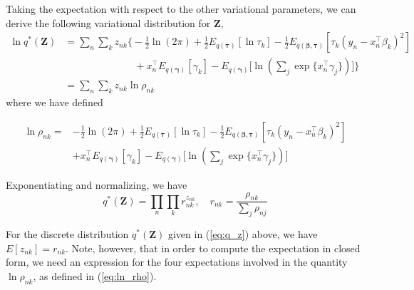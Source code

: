 \documentclass[twoside,11pt]{article}
\newcommand{\tr}{\intercal}
\begin{document}

\newpage

\appendix
\section{ } 
\label{app:q_z}

Taking the expectation with respect to the other variational parameters, we can derive the following variational distribution for $\mathbf{Z}$,
\begin{align*}
	\ln q^{*}(\mathbf{Z}) &= \sum_n \sum_k z_{nk} \Bigg\{  -\frac{1}{2}\ln(2\pi) + \frac{1}{2} E_{q(\boldsymbol\tau)}[ \ln \tau_k ] - \frac{1}{2} E_{q(\boldsymbol\beta, \boldsymbol\tau)}[\tau_k (y_n - x_n^{\tr}\beta_k)^2] \\ 
	&\qquad \qquad \qquad \quad + x_n^{\tr}E_{q(\boldsymbol\gamma)}[\gamma_k] - E_{q(\boldsymbol\gamma)}\Bigg[\ln \left( \sum_{j} \exp \{ x_n^{\tr} \gamma_j \}\right)\Bigg]\Bigg\} \\
	&= \sum_n \sum_k z_{nk} \ln \rho_{nk}
\end{align*}
where we have defined 

\begin{equation} \label{eq:ln_rho}
\begin{split}
 \ln \rho_{nk} = &-\frac{1}{2}\ln(2\pi) + \frac{1}{2} E_{q(\boldsymbol\tau)}[ \ln \tau_k ] - \frac{1}{2} E_{q(\boldsymbol\beta, \boldsymbol\tau)}[\tau_k (y_n - x_n^{\tr}\beta_k)^2] \\ 
	& + x_n^{\tr}E_{q(\boldsymbol\gamma)}[\gamma_k] - E_{q(\boldsymbol\gamma)}\Bigg[\ln \left( \sum_{j} \exp \{ x_n^{\tr} \gamma_j \}\right)\Bigg]
\end{split}
\end{equation}


Exponentiating and normalizing, we have
\begin{equation} \label{eq:q_z}
	q^{*}(\mathbf{Z}) = \prod_{n} \prod_{k} r_{nk}^{z_{nk}}, \quad r_{nk} = \frac{\rho_{nk}}{\sum_{j} \rho_{nj}}
\end{equation}

For the discrete distribution $q^{*}(\mathbf{Z})$ given in (\ref{eq:q_z}) above, we have $E[z_{nk}] = r_{nk}$. Note, however, that in order to compute the expectation in closed form, we need an expression for the four expectations involved in the quantity $\ln \rho_{nk}$, as defined in (\ref{eq:ln_rho}). \\
\end{document}
